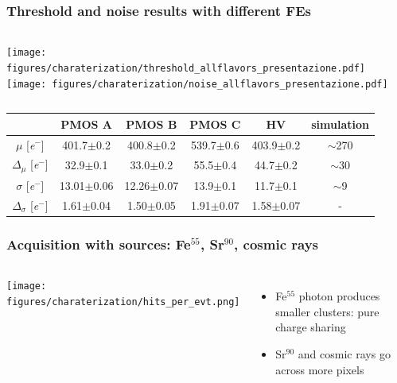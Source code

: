     \begin{frame}[noframenumbering]
        \frametitle{Threshold and noise results with different FEs}
        \begin{columns}
                \texttt{[image: figures/charaterization/threshold\_allflavors\_presentazione.pdf]}
                \texttt{[image: figures/charaterization/noise\_allflavors\_presentazione.pdf]} 
        \end{columns}                  
        \begin{table}[h!]
            \footnotesize
            \begin{tabular}{| c |  c | c | c |c || c|}
            \hline
            & PMOS A & PMOS B & PMOS C & HV & simulation \\
            \hline
            \hline
            $\mu$ [\si{\elementarycharge}$^-$] & 401.7$\pm$0.2 & 400.8$\pm$0.2 & 539.7$\pm$0.6 &  403.9$\pm$0.2 & $\sim$270\\
            $\Delta_{\mu}$ [\si{\elementarycharge}$^-$] & 32.9$\pm$0.1 & 33.0$\pm$0.2 & 55.5$\pm$0.4 & 44.7$\pm$0.2 & $\sim$30\\
            $\sigma$ [\si{\elementarycharge}$^-$] & 13.01$\pm$0.06 & 12.26$\pm$0.07 & 13.9$\pm$0.1 & 11.7$\pm$0.1 & $\sim$9 \\
            $\Delta_{\sigma}$ [\si{\elementarycharge}$^-$] & 1.61$\pm$0.04 & 1.50$\pm$0.05 & 1.91$\pm$0.07 & 1.58$\pm$0.07 & -\\
            \hline
            \end{tabular}
        \end{table}       
    \end{frame}




    \begin{frame}[noframenumbering]
        \frametitle{Acquisition with sources: Fe$^{55}$, Sr$^{90}$, cosmic rays}
        \begin{columns}
                \texttt{[image: figures/charaterization/hits\_per\_evt.png]}
                \begin{itemize}
                    \item Fe$^{55}$ photon produces smaller clusters: pure charge sharing
                    \item Sr$^{90}$ and cosmic rays go across more pixels 
                \end{itemize}    
        \end{columns}
    \end{frame}    

